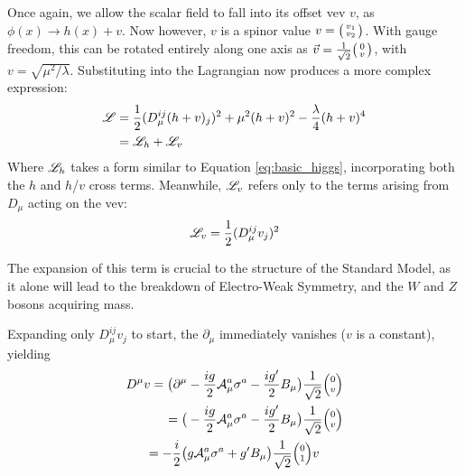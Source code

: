         Once again, we allow the scalar field to fall into its offset vev $v$, as $\phi(x) \rightarrow h(x) + v$.
        Now however, $v$ is a spinor value $v = \big(\begin{smallmatrix} v_1 \\ v_2 \end{smallmatrix}\big)$.
        With gauge freedom, this can be rotated entirely along one axis as $\vec{v} = \frac{1}{\sqrt{2}}\big(\begin{smallmatrix} 0 \\ v \end{smallmatrix}\big)$,
            with $v = \sqrt{\mu^2/\lambda}$.
        Substituting into the Lagrangian now produces a more complex expression:
        \begin{equation} \begin{split}
            \label{eq:fullHiggs}
            \mathscr{L} & = \frac{1}{2} (D_{\mu}^{ij} (h+v)_j)^2
                + \mu^2 (h+v)^2
                - \frac{\lambda}{4} (h+v)^4 \\
             & = \mathscr{L}_h + \mathscr{L}_v
        \end{split} \end{equation}
        Where $\mathscr{L}_h$ takes a form similar to Equation \ref{eq:basic_higgs}, incorporating both the $h$ and $h$/$v$ cross terms.
        Meanwhile, $\mathscr{L}_v$ refers only to the terms arising from $D_{\mu}$ acting on the vev:
        \begin{equation}
            \label{eq:lagV}
            \mathscr{L}_v = \frac{1}{2} (D_{\mu}^{ij} v_j)^2
        \end{equation}

        The expansion of this term is crucial to the structure of the Standard Model,
            as it alone will lead to the breakdown of Electro-Weak Symmetry,
            and the $W$ and $Z$ bosons acquiring mass.

        Expanding only $D_{\mu}^{ij} v_j$ to start, the $\partial_{\mu}$ immediately vanishes ($v$ is a constant), yielding 
        \begin{equation} \begin{split}
            D^{\mu} v  = \big( \partial^{\mu} & - \frac{ig}{2} \wField^a_{\mu} \sigma^a - \frac{ig'}{2} B_{\mu} \big) \frac{1}{\sqrt{2}}\minimatrix{0\\v} \\
            = \big( & - \frac{ig}{2} \wField^a_{\mu} \sigma^a - \frac{ig'}{2} B_{\mu} \big) \frac{1}{\sqrt{2}}\minimatrix{0\\v} \\
            = - \frac{i}{2} \big( & g \wField^a_{\mu} \sigma^a + g' B_{\mu} \big) \frac{1}{\sqrt{2}}\minimatrix{0\\1} v
        \end{split} \end{equation}

